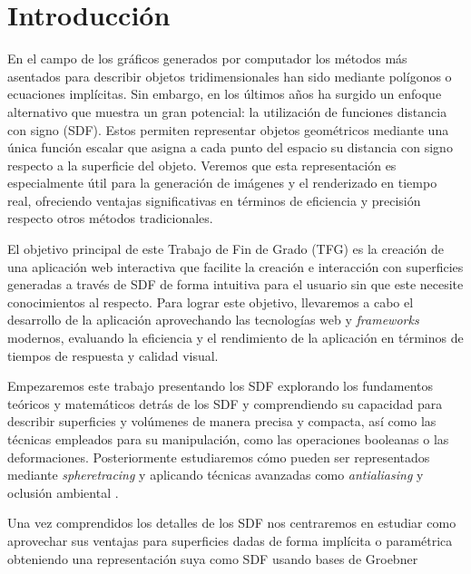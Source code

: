 %


\chapter{Introducción}
En el campo de los gráficos generados por computador los métodos más asentados para describir objetos tridimensionales han sido mediante polígonos o ecuaciones implícitas. Sin embargo, en los últimos años ha surgido un enfoque alternativo que muestra un gran potencial: la utilización de funciones distancia con signo (SDF). Estos permiten representar objetos geométricos mediante una única función escalar que asigna a cada punto del espacio su distancia con signo respecto a la superficie del objeto. Veremos que esta representación es especialmente útil para la generación de imágenes y el renderizado en tiempo real, ofreciendo ventajas significativas en términos de eficiencia y precisión respecto otros métodos tradicionales.\newline


El objetivo principal de este Trabajo de Fin de Grado (TFG) es la creación de una aplicación web interactiva que facilite la creación e interacción con superficies generadas a través de SDF de forma intuitiva para el usuario sin que este necesite conocimientos al respecto. Para lograr este objetivo, llevaremos a cabo el desarrollo de la aplicación aprovechando las tecnologías web y \textit{frameworks} modernos, evaluando la eficiencia y el rendimiento de la aplicación en términos de tiempos de respuesta y calidad visual.\newline


Empezaremos este trabajo presentando los SDF explorando los fundamentos teóricos y matemáticos detrás de los SDF y comprendiendo su capacidad para describir superficies y volúmenes de manera precisa y compacta, así como las técnicas empleados para su manipulación, como las operaciones booleanas o las deformaciones. Posteriormente estudiaremos cómo pueden ser representados mediante \textit{spheretracing} y aplicando técnicas avanzadas como \textit{antialiasing} y oclusión ambiental .\newline

Una vez comprendidos los detalles de los SDF nos centraremos en estudiar como aprovechar sus ventajas para superficies dadas de forma implícita o paramétrica obteniendo una representación suya como SDF usando bases de Groebner

\endinput

